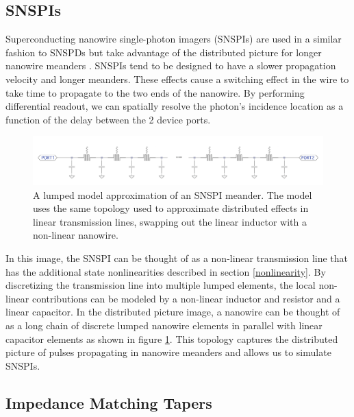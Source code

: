 \subsection{SNSPIs} \label{snspi_intro}

Superconducting nanowire single-photon imagers (SNSPIs) are used in a similar fashion
to SNSPDs but take advantage of the distributed picture for longer nanowire meanders
 \cite{snspi_paper}.
SNSPIs tend to be designed to have a slower propagation velocity and longer meanders.
These effects cause a switching effect in the wire to take time to propagate to the two 
ends of the nanowire. By performing differential readout, we can spatially resolve
the photon's incidence location as a function of the delay between the 2 device ports.

\begin{figure}
    \centering
    \includegraphics[width=\textwidth]{figs/snspi_meander.png}
    \caption{A lumped model approximation of an SNSPI meander. The model uses the same
    topology used to approximate distributed effects in linear transmission lines,
    swapping out the linear inductor with a non-linear nanowire.}
    \label{fig:snspi_tline}
\end{figure}

In this image, the SNSPI can be thought of as a non-linear transmission line that
has the additional state nonlinearities described in section \ref{nonlinearity}. By discretizing the transmission line
into multiple lumped elements, the local non-linear contributions can be modeled by a
non-linear inductor and resistor and a linear capacitor. In the distributed picture image,
a nanowire can be thought of as a long chain of discrete lumped nanowire elements in parallel
with linear capacitor elements as shown in figure \ref{fig:snspi_tline}. This topology captures the distributed picture of
pulses propagating in nanowire meanders and allows us to simulate SNSPIs.

\subsection{Impedance Matching Tapers} \label{tapers_intro}


